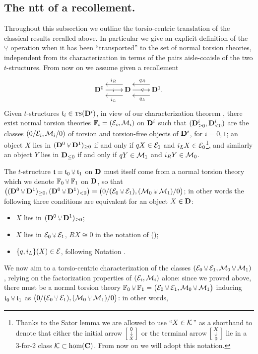 \subsection{The {\sc ntt} of a recollement.}
Throughout this subsection we outline the torsio\hyp{}centric translation of the classical results recalled above. In particular we give an explicit definition of the $\glue$ operation when it has been ``transported'' to the set of normal torsion theories, independent from its characterization in terms of the pairs aisle\hyp{}coaisle of the two $t$\hyp{}structures. From now on we assume given a recollement
$$
\xymatrix{
  \D^0	& \D	& \D^1.
  \ar|i "1,1";"1,2" 
  \ar@<8pt> "1,2";"1,1" ^{i_L}
  \ar@<-8pt> "1,2";"1,1" _{i_R}
  \ar|q "1,2";"1,3" 
  \ar@<8pt> "1,3";"1,2" ^{q_L}
  \ar@<-8pt> "1,3";"1,2" _{q_R}
}$$
Given $t$\hyp{}structures $\mathfrak{t}_i\in  \text{\scshape ts} (\mathbf{D}^i)$, in view of our characterization theorem , there exist normal torsion theories $\mathbb{F}_i=(\mathcal{E}_i, \mathcal{M}_i)$ on $\mathbf{D}^i$ such that $(\mathbf{D}^i_{\ge 0}, \mathbf{D}^i_{<0})$ are the classes $(0/\mathcal{E}_i,\mathcal{M}_i/0)$ of torsion and torsion\hyp{}free objects of $\mathbf{D}^i$, for $i=0,1$; an object $X$ lies in $(\D^0\glue \D^1)_{\ge 0}$ if and only if $qX\in \mathcal{E}_1$ and $i_LX\in \mathcal{E}_0$\footnote{Thanks to the Sator lemma we are allowed to use ``$X\in \mathcal{K}$'' as a shorthand to denote that either the initial arrow $\left[ \begin{smallmatrix} 0 \\ \downarrow \\ X \end{smallmatrix} \right]$ or the terminal arrow $\left[ \begin{smallmatrix} X \\ \downarrow \\ 0 \end{smallmatrix} \right]$ lie in a 3-for-2 class $\mathcal{K} \subset \text{hom}(\mathbf{C})$. From now on we will adopt this notation.}, and similarly an object $Y$ lies in $\mathbf{D}_{\le 0}$ if and only if $qY\in \mathcal{M}_1$ and $i_RY\in \mathcal{M}_0$.
\begin{remark}\label{must.itself.come}
The $t$\hyp{}structure $\tee = \tee_0\glue \tee_1$ on $\mathbf{D}$ must itself come from a normal torsion theory which we denote $\fF_0\glue \fF_1$ on $\mathbf{D}$, so that $\big((\D^0\glue \D^1)_{\ge 0},(\D^0\glue \D^1)_{<0}\big)=\big(0/(\EE_0\glue\EE_1), (\MM_0\glue \MM_1)/0\big)$; in other words the following three conditions are equivalent for an object $X\in\mathbf{D}$:
\begin{itemize}
\item $X$ lies in $(\D^0\glue \D^1)_{\ge 0}$;
\item $X$ lies in $\EE_0\glue\EE_1$, \ie $RX\cong 0$ in the notation of ();
\item $\{q, i_L\}(X)\in \mathcal{E}$, following Notation .
\end{itemize}
\end{remark}
We now aim to a torsio\hyp{}centric characterization of the classes $(\EE_0\glue\EE_1, \MM_0\glue \MM_1)$, relying on the factorization properties of $(\mathcal{E}_i, \mathcal{M}_i)$ alone: since we proved  above, there must be a normal torsion theory $\fF_0\glue \fF_1 = \big(\EE_0\glue\EE_1, \MM_0\glue\MM_1\big)$ inducing $\tee_0\glue\tee_1$ as $\big(0/(\EE_0\glue\EE_1), (\MM_0\glue\MM_1)/0\big)$: in other words,
